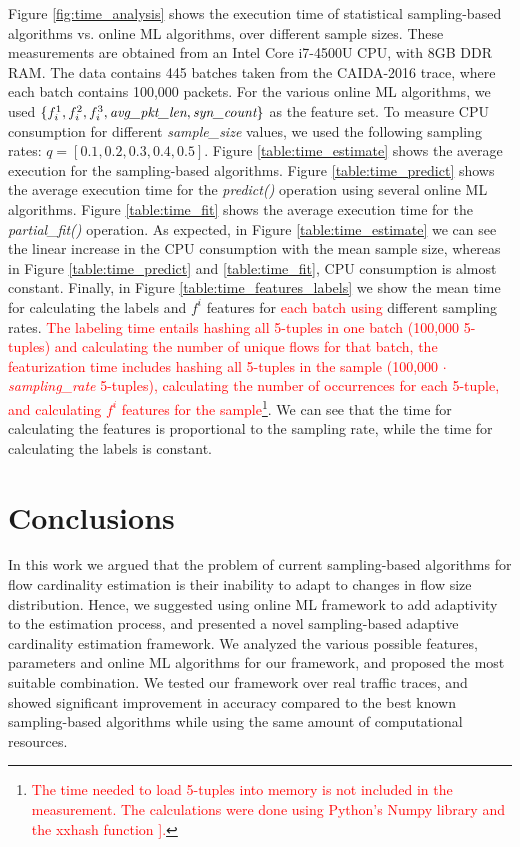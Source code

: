 		Figure \ref{fig:time_analysis} shows the execution time of statistical sampling-based algorithms vs. online
		ML algorithms, over different sample sizes. These measurements are obtained from an Intel Core i7-4500U CPU,
		with 8GB DDR RAM. The data contains 445 batches taken from the CAIDA-2016 trace, where each batch contains
		100,000 packets. For the various online ML algorithms, we used $\{f_i^1, f_i^2, f_i^3, \emph{avg\_pkt\_len},
		\emph{syn\_count}\}$ as the feature set. To measure CPU consumption for different \emph{sample\_size} values,
		we used the following sampling rates: $q = [0.1, 0.2, 0.3, 0.4, 0.5]$. Figure \ref{table:time_estimate}
		shows the average execution for the sampling-based algorithms.  Figure \ref{table:time_predict} shows
		the average execution time for the \emph{predict()} operation using several online ML algorithms. Figure
		\ref{table:time_fit} shows the average execution time for the \emph{partial\_fit()} operation. As expected, in
		Figure \ref{table:time_estimate} we can see the linear increase in the CPU consumption with the mean sample
		size, whereas in Figure \ref{table:time_predict} and \ref{table:time_fit}, CPU consumption is almost constant.
        Finally, in Figure \ref{table:time_features_labels} we show the mean time for calculating the labels and $f^i$ features for \textcolor{red}{each batch using} different sampling rates. \textcolor{red}{The labeling time entails hashing all 5-tuples in one batch (100,000 5-tuples) and calculating the number of unique flows for that batch, the featurization time includes hashing all 5-tuples in the sample (100,000 $\cdot$ \emph{sampling\_rate} 5-tuples), calculating the number of occurrences for each 5-tuple, and calculating $f^i$ features for the sample\footnote{\textcolor{red}{The time needed to load 5-tuples into memory is not included in the measurement. The calculations were done using Python's Numpy library \cite{van2011numpy} and the xxhash function \cite{collet2016xxhash}].}}}. We can see that the time for calculating the features is proportional to the sampling rate, while the time for calculating the labels is constant.

\section{Conclusions} \label{sec:conclusions}
	
		In this work we argued that the problem of current sampling-based algorithms for flow cardinality estimation is their inability to adapt to changes in flow size distribution. Hence, we suggested using online ML framework to add adaptivity to the estimation process, and presented a novel sampling-based adaptive cardinality estimation framework. We analyzed the various possible features, parameters and online ML algorithms for our framework, and proposed the most suitable combination. We tested our framework over real traffic traces, and showed significant improvement in accuracy compared to the best known sampling-based algorithms while using the same amount of computational resources.
	
